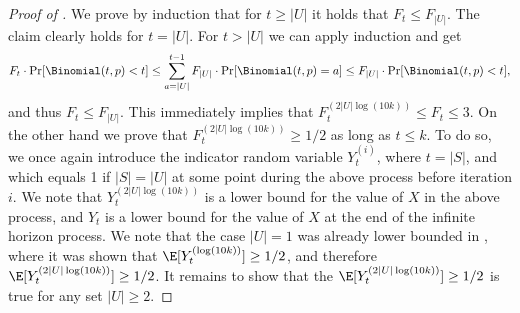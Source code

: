 \begin{proof}[Proof of ]
We prove by induction that for $t \ge |U|$ it holds that 
$F_t \le F_{|U|}$.
The claim clearly holds for $t=|U|$. For $t> |U|$ we can apply induction and get
$$
F_t\cdot \Pr[\Binomial(t,p)<t] \le  \sum_{a=|U|}^{t-1} F_{|U|} \cdot \Pr[\Binomial(t,p)=a]  \le F_{|U|}\cdot \Pr[\Binomial(t,p)<t],$$
and thus $F_t \le F_{|U|}$. This immediately implies that $F_t^{(2|U|\log(10k))} \leq F_t \leq 3$.
On the other hand we prove that $F_t^{(2|U|\log(10k))} \ge 1/2$ as long as $t\leq k$. To do so, we once again introduce the indicator random variable $Y_t^{(i)}$, where $t = |S|$, and which equals 1 if $|S|=|U|$ at some point during the above process before iteration $i$. We note that $Y_t^{(2|U|\log(10k))}$ is a lower bound for the value of $X$ in the above process, and $Y_t$ is a lower bound for the value of $X$ at the end of the infinite horizon process. We note that the case $|U|=1$ was already lower bounded in , where it was shown that $\E[Y_t^{(\log(10k))}] \ge 1/2$, and therefore $\E[Y_t^{(2|U|\log(10k))}] \ge 1/2$.
It remains to show that the $\E[Y_t^{(2|U|\log(10k))}] \ge 1/2$ is true for any set $|U| \ge 2$.


\end{proof}
